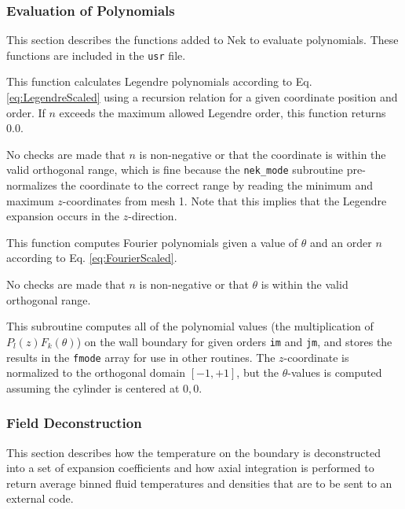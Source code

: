 \documentclass[10pt]{article}
\newcounter{subsubsubsection}[subsubsection]
\numberwithin{equation}{section} %
\begin{document}
\subsubsection{Evaluation of Polynomials}
This section describes the functions added to Nek to evaluate polynomials. These functions are included in the {\tt usr} file.

This function calculates Legendre polynomials according to Eq. \eqref{eq:LegendreScaled} using a recursion relation for a given coordinate position and order. If \(n\) exceeds the maximum allowed Legendre order, this function returns 0.0.

\color{magenta}
No checks are made that \(n\) is non-negative or that the coordinate is within the valid orthogonal range, which is fine because the {\tt nek\_mode} subroutine pre-normalizes the coordinate to the correct range by reading the minimum and maximum \(z\)-coordinates from mesh 1. Note that this implies that the Legendre expansion occurs in the \(z\)-direction.
\color{black}

This function computes Fourier polynomials given a value of \(\theta\) and an order \(n\) according to Eq. \eqref{eq:FourierScaled}. 

\color{magenta}
No checks are made that \(n\) is non-negative or that \(\theta\) is within the valid orthogonal range.
\color{black}

This subroutine computes all of the polynomial values (the multiplication of \(P_l(z)F_k(\theta)\)) on the wall boundary for given orders {\tt im} and {\tt jm}, and stores the results in the {\tt fmode} array for use in other routines. The \(z\)-coordinate is normalized to the orthogonal domain \([-1, +1]\), but the \(\theta\)-values is computed assuming the cylinder is centered at \(0, 0\). 

\subsubsection{Field Deconstruction}
This section describes how the temperature on the boundary is deconstructed into a set of expansion coefficients and how axial integration is performed to return average binned fluid temperatures and densities that are to be sent to an external code. 
\end{document}
